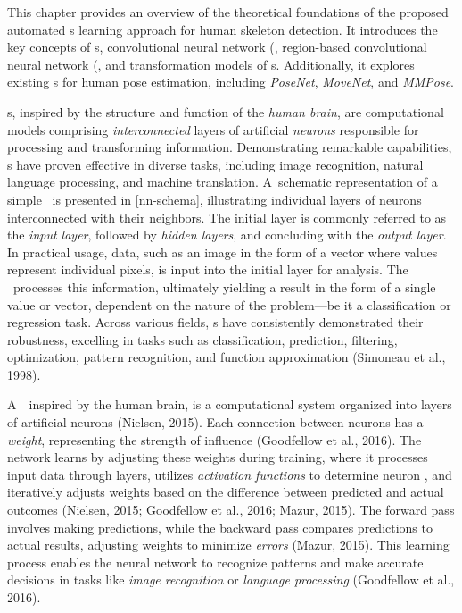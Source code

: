 This chapter provides an overview of the theoretical foundations of the proposed automated \NN\-s learning approach for human skeleton detection. It introduces the key concepts of \NN\-s, convolutional neural network  (\CNN\), region-based convolutional neural network  (\RCNN\), and transformation models of \NN\-s. Additionally, it explores existing \NN\-s for human pose estimation, including {\em PoseNet}, {\em MoveNet}, and {\em MMPose}.

\NN\-s, inspired by the structure and function of the {\em human brain}, are computational models comprising {\em interconnected} layers of artificial {\em neurons} responsible for processing and transforming information. Demonstrating remarkable capabilities, \NN\-s have proven effective in diverse tasks, including image recognition, natural language processing, and machine translation. A~schematic representation of a simple \NN\ is presented in [nn-schema], illustrating individual layers of neurons interconnected with their neighbors. The initial layer is commonly referred to as the {\em input layer}, followed by {\em hidden layers}, and concluding with the {\em output layer}. In practical usage, data, such as an image in the form of a vector where values represent individual pixels, is input into the initial layer for analysis. The \NN\ processes this information, ultimately yielding a result in the form of a single value or vector, dependent on the nature of the problem—be it a classification or regression task. Across various fields, \NN\-s have consistently demonstrated their robustness, excelling in tasks such as classification, prediction, filtering, optimization, pattern recognition, and function approximation (\scc Simoneau et al., 1998).


A~\NN\, inspired by the human brain, is a computational system organized into layers of artificial neurons (\scc Nielsen, 2015). Each connection between neurons has a {\em weight}, representing the strength of influence (\scc Goodfellow et al., 2016). The network learns by adjusting these weights during training, where it processes input data through layers, utilizes {\em activation functions} to determine neuron , and iteratively adjusts weights based on the difference between predicted and actual outcomes (\scc Nielsen, 2015; \scc Goodfellow et al., 2016; \scc Mazur, 2015). The forward pass involves making predictions, while the backward pass compares predictions to actual results, adjusting weights to minimize {\em errors} (\scc Mazur, 2015). This learning process enables the neural network to recognize patterns and make accurate decisions in tasks like {\em image recognition} or {\em language processing} (\scc Goodfellow et al., 2016).

